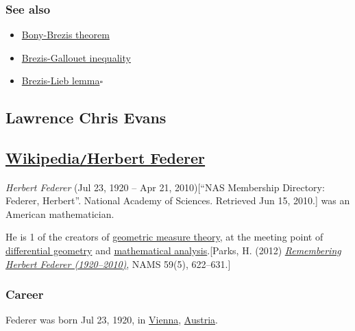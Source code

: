 \documentclass{article}
\begin{document}
\subsubsection{See also}
\begin{itemize}
	\item \href{https://en.wikipedia.org/wiki/Bony%E2%80%93Brezis_theorem}{Bony-Brezis theorem}
	\item \href{https://en.wikipedia.org/wiki/Brezis%E2%80%93Gallouet_inequality}{Brezis-Gallouet inequality}
	\item \href{https://en.wikipedia.org/wiki/Brezis%E2%80%93Lieb_lemma}{Brezis-Lieb lemma}\hfill$\square$
\end{itemize}



\subsection{Lawrence Chris Evans}


\subsection{\href{https://en.wikipedia.org/wiki/Herbert_Federer}{Wikipedia\texttt{/}Herbert Federer}}
\textit{Herbert Federer} (Jul 23, 1920 -- Apr 21, 2010)[``NAS Membership Directory: Federer, Herbert''. National Academy of Sciences. Retrieved Jun 15, 2010.] was an American mathematician.

He is 1 of the creators of \href{https://en.wikipedia.org/wiki/Geometric_measure_theory}{geometric measure theory}, at the meeting point of \href{https://en.wikipedia.org/wiki/Differential_geometry}{differential geometry} and \href{https://en.wikipedia.org/wiki/Mathematical_analysis}{mathematical analysis}.[Parks, H. (2012) \href{http://www.ams.org/notices/201205/rtx120500622p.pdf}{\textit{Remembering Herbert Federer (1920--2010)}}, NAMS 59(5), 622--631.]

\subsubsection{Career}
Federer was born Jul 23, 1920, in \href{https://en.wikipedia.org/wiki/Vienna}{Vienna}, \href{https://en.wikipedia.org/wiki/Austria}{Austria}.
\end{document}
